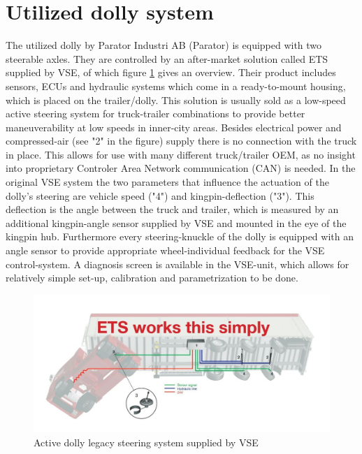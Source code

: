 \documentclass[ExampleMasters.tex]{subfiles}
\begin{document}
\section{Utilized dolly system}
\label{sec:dolly_system}
The utilized dolly by Parator Industri AB (Parator) is equipped with two steerable axles. They are controlled by an after-market solution called \gls{ETS} supplied by \gls{VSE}, of which figure \ref{fig:legacy_system_vse} gives an overview. Their product includes sensors, \gls{ECU}s and hydraulic systems which come in a ready-to-mount housing, which is placed on the trailer/dolly. This solution is usually sold as a low-speed active steering system for truck-trailer combinations to provide better maneuverability at low speeds in inner-city areas. Besides electrical power and compressed-air (see "2" in the figure) supply there is no connection with the truck in place. This allows for use with many different truck/trailer \gls{OEM}, as no insight into proprietary Controler Area Network communication (CAN) is needed. In the original \gls{VSE} system the two parameters that influence the actuation of the dolly's steering are vehicle speed ("4") and kingpin-deflection ("3"). This deflection is the angle between the truck and trailer, which is measured by an additional kingpin-angle sensor supplied by \gls{VSE} and mounted in the eye of the kingpin hub. Furthermore every steering-knuckle of the dolly is equipped with an angle sensor to provide appropriate wheel-individual feedback for the \gls{VSE} control-system. A diagnosis screen is available in the \gls{VSE}-unit, which allows for relatively simple set-up, calibration and parametrization to be done.\cite{dolly_datasheet}

\begin{figure}[!htb]
	\centering
	\includegraphics[width=1.0\linewidth]{figures/legacy_system_vse}
	\caption{Active dolly legacy steering system supplied by VSE\cite{dolly_datasheet}}
	\label{fig:legacy_system_vse}
\end{figure}
\end{document}
